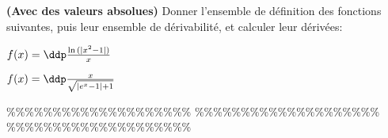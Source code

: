 



\begin{exercice}  \;
\textbf{(Avec des valeurs absolues)} Donner l'ensemble de d\'efinition des fonctions suivantes, puis leur ensemble de d\'erivabilit\'e, et calculer leur d\'eriv\'ees:\\
\begin{enumerate}
\begin{minipage}[t]{0.4\textwidth}
\item $f(x)=\ddp\frac{\ln{(|x^2-1|)}}{x}$
\end{minipage}
\begin{minipage}[t]{0.4\textwidth}
\item $f(x)=\ddp\frac{x}{\sqrt{|e^x-1|+1}}$
\end{minipage}
\end{enumerate}
\end{exercice}


\%\%\%\%\%\%\%\%\%\%\%\%\%\%\%\%\%\%\%\%
\%\%\%\%\%\%\%\%\%\%\%\%\%\%\%\%\%\%\%\%
\%\%\%\%\%\%\%\%\%\%\%\%\%\%\%\%\%\%\%\%



